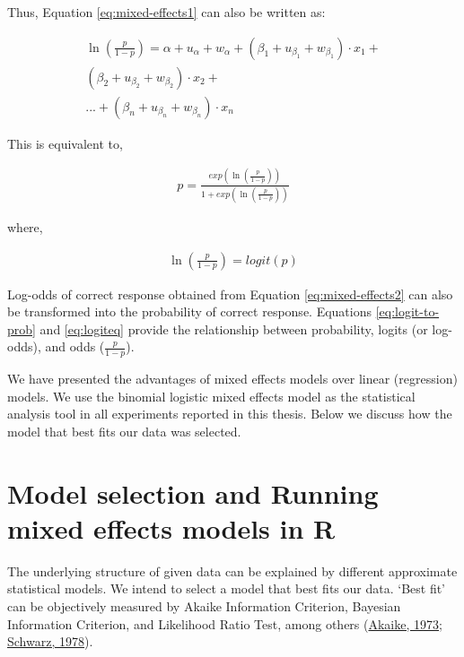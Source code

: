 \documentclass[a4paper, nobind]{templates/ociamthesis}
\begin{document}
Thus, Equation \eqref{eq:mixed-effects1} can also be written as:

\begin{align} \label{eq:mixed-effects2}
\ln (\frac{p}{1-p}) = \alpha + u_{\alpha} + w_{\alpha} +
                      (\beta_{1} + u_{\beta_{1}} + w_{\beta_{1}})\cdot {x_1} + \nonumber\\
                      (\beta_{2} + u_{\beta_{2}} + w_{\beta_{2}})\cdot {x_2} + \nonumber\\
                      ... + (\beta_{n} + u_{\beta_{n}} + w_{\beta_{n}})\cdot {x_n} 
\end{align}

This is equivalent to,

\begin{align} \label{eq:logit-to-prob}
p = {\frac{exp(\ln(\frac{p}{1-p}))}{1 + exp (\ln(\frac{p}{1-p}))}}
\end{align}

where,

\begin{align} \label{eq:logiteq}
\ln(\frac{p}{1-p}) =
{logit}(p)
\end{align}

Log-odds of correct response obtained from Equation \eqref{eq:mixed-effects2} can also be transformed into the probability of correct response.
Equations \eqref{eq:logit-to-prob} and \eqref{eq:logiteq} provide the relationship between probability, logits (or log-odds), and odds (\(\frac{p}{1-p}\)).

We have presented the advantages of mixed effects models over linear (regression) models.
We use the binomial logistic mixed effects model as the statistical analysis tool in all experiments reported in this thesis.
Below we discuss how the model that best fits our data was selected.

\hypertarget{analysis-main}{%
\section{Model selection and Running mixed effects models in R}\label{analysis-main}}

The underlying structure of given data can be explained by different approximate statistical models.
We intend to select a model that best fits our data.
`Best fit' can be objectively measured by Akaike Information Criterion, Bayesian Information Criterion, and Likelihood Ratio Test, among others (\protect\hyperlink{ref-Akaike1973}{Akaike, 1973}; \protect\hyperlink{ref-Schwarz1978}{Schwarz, 1978}).
\end{document}
